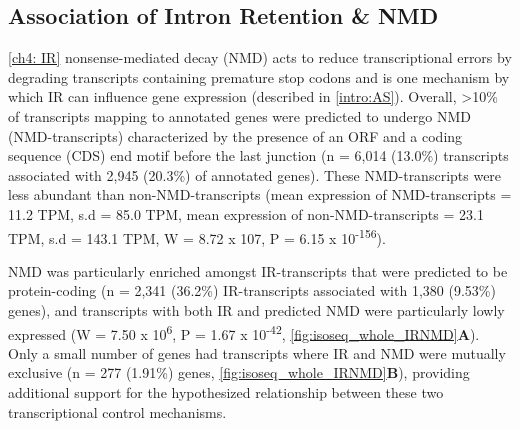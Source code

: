 \subsection{Association of Intron Retention \& NMD}
\cref{ch4: IR}
nonsense-mediated decay (NMD) acts to reduce transcriptional errors by degrading transcripts containing premature stop codons\cite{Hug2015} and is one mechanism by which IR can influence gene expression\cite{Pan2006} (described in \cref{intro:AS}). Overall, >10\% of transcripts mapping to annotated genes were predicted to undergo NMD (NMD-transcripts) characterized by the presence of an ORF and a coding sequence (CDS) end motif before the last junction (n = 6,014 (13.0\%) transcripts associated with 2,945 (20.3\%) of annotated genes). These NMD-transcripts were less abundant than non-NMD-transcripts (mean expression of NMD-transcripts = 11.2 TPM, s.d =  85.0 TPM, mean expression of non-NMD-transcripts = 23.1 TPM, s.d = 143.1 TPM, W = 8.72 x 107, P = 6.15 x 10\textsuperscript{-156}).  

NMD was particularly enriched amongst IR-transcripts that were predicted to be protein-coding (n = 2,341 (36.2\%) IR-transcripts associated with 1,380 (9.53\%) genes), and transcripts with both IR and predicted NMD were particularly lowly expressed (W = 7.50 x 10\textsuperscript{6}, P = 1.67 x 10\textsuperscript{-42}, \cref{fig:isoseq_whole_IRNMD}\textbf{A}). Only a small number of genes had transcripts where IR and NMD were mutually exclusive (n = 277 (1.91\%) genes, \cref{fig:isoseq_whole_IRNMD}\textbf{B}), providing additional support for the hypothesized relationship between these two transcriptional control mechanisms\cite{Ge2014}. 


